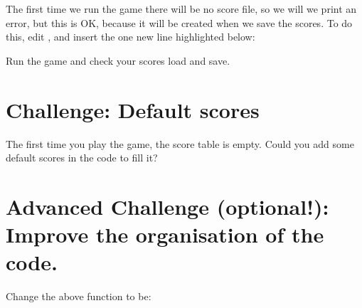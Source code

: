 \documentclass[letterpaper,10pt,english]{sphinxmanual}
\begin{document}
\sphinxAtStartPar
The first time we run the game there will be no score file, so we will
we print an error, but this is OK, because it will be created when we
save the scores. To do this, edit , and insert the one
new line highlighted below:

\begin{sphinxVerbatim}[commandchars=\\\{\}]
 
\end{sphinxVerbatim}

\sphinxAtStartPar
Run the game and check your scores load and save.


\section{Challenge: Default scores}
\label{\detokenize{tutorial:challenge-default-scores}}
\sphinxAtStartPar
The first time you play the game, the score table is empty. Could you
add some default scores in the code to fill it?


\section{Advanced Challenge (optional!): Improve the organisation of the code.}
\label{\detokenize{tutorial:advanced-challenge-optional-improve-the-organisation-of-the-code}}
\sphinxAtStartPar
Change the above function to be:

\begin{sphinxVerbatim}[commandchars=\\\{\}]
 
\end{sphinxVerbatim}
\end{document}
